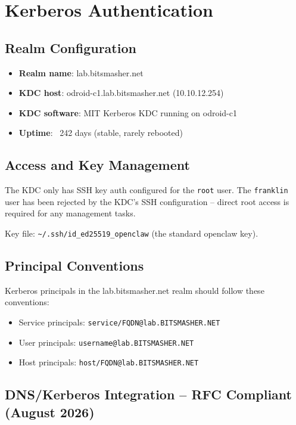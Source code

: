 \section{Kerberos Authentication}

\subsection{Realm Configuration}

\begin{itemize}
    \item \textbf{Realm name}: lab.bitsmasher.net
    
    \item \textbf{KDC host}: odroid-c1.lab.bitsmasher.net (10.10.12.254)
    
    \item \textbf{KDC software}: MIT Kerberos KDC running on odroid-c1
    
    \item \textbf{Uptime}: ~242 days (stable, rarely rebooted)
\end{itemize}

\subsection{Access and Key Management}

The KDC only has SSH key auth configured for the \texttt{root} user. The \texttt{franklin} user has been rejected by the KDC's SSH configuration -- direct root access is required for any management tasks.

Key file: \texttt{\textasciitilde/.ssh/id\_ed25519\_openclaw} (the standard openclaw key).

\subsection{Principal Conventions}

Kerberos principals in the lab.bitsmasher.net realm should follow these conventions:
\begin{itemize}
    \item Service principals: \texttt{service/FQDN@lab.BITSMASHER.NET}
    \item User principals: \texttt{username@lab.BITSMASHER.NET}
    \item Host principals: \texttt{host/FQDN@lab.BITSMASHER.NET}
\end{itemize}

\subsection{DNS/Kerberos Integration -- RFC Compliant (August 2026)}

